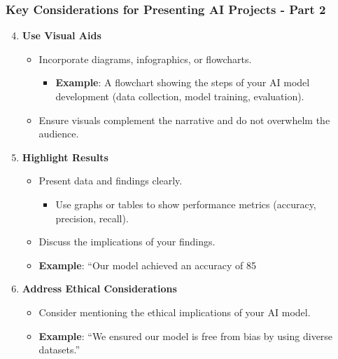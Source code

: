 \documentclass{beamer}
\begin{document}
\begin{frame}[fragile]
    \frametitle{Key Considerations for Presenting AI Projects - Part 2}
    \begin{enumerate}
        \setcounter{enumi}{3} %
        
        \item \textbf{Use Visual Aids}
            \begin{itemize}
                \item Incorporate diagrams, infographics, or flowcharts.
                    \begin{itemize}
                        \item \textbf{Example}: A flowchart showing the steps of your AI model development (data collection, model training, evaluation).
                    \end{itemize}
                \item Ensure visuals complement the narrative and do not overwhelm the audience.
            \end{itemize}
        
        \item \textbf{Highlight Results}
            \begin{itemize}
                \item Present data and findings clearly.
                    \begin{itemize}
                        \item Use graphs or tables to show performance metrics (accuracy, precision, recall).
                    \end{itemize}
                \item Discuss the implications of your findings.
                    \item \textbf{Example}: “Our model achieved an accuracy of 85%
            \end{itemize}
        
        \item \textbf{Address Ethical Considerations}
            \begin{itemize}
                \item Consider mentioning the ethical implications of your AI model.
                    \item \textbf{Example}: “We ensured our model is free from bias by using diverse datasets.”
            \end{itemize}
    \end{enumerate}
\end{frame}
\end{document}
